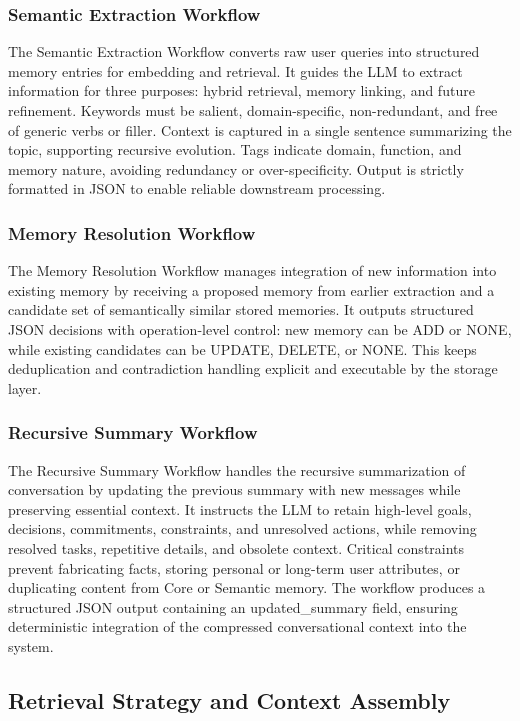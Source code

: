 \documentclass[12pt,a4paper]{article}
\begin{document}
\subsubsection{Semantic Extraction Workflow}

The Semantic Extraction Workflow converts raw user queries into structured memory entries for embedding and retrieval. It guides the LLM to extract information for three purposes: hybrid retrieval, memory linking, and future refinement. Keywords must be salient, domain-specific, non-redundant, and free of generic verbs or filler. Context is captured in a single sentence summarizing the topic, supporting recursive evolution. Tags indicate domain, function, and memory nature, avoiding redundancy or over-specificity. Output is strictly formatted in JSON to enable reliable downstream processing.

\subsubsection{Memory Resolution Workflow}

The Memory Resolution Workflow manages integration of new information into existing memory by receiving a proposed memory from earlier extraction and a candidate set of semantically similar stored memories. It outputs structured JSON decisions with operation-level control: new memory can be ADD or NONE, while existing candidates can be UPDATE, DELETE, or NONE. This keeps deduplication and contradiction handling explicit and executable by the storage layer.

\subsubsection{Recursive Summary Workflow}

The Recursive Summary Workflow handles the recursive summarization of conversation by updating the previous summary with new messages while preserving essential context. It instructs the LLM to retain high-level goals, decisions, commitments, constraints, and unresolved actions, while removing resolved tasks, repetitive details, and obsolete context. Critical constraints prevent fabricating facts, storing personal or long-term user attributes, or duplicating content from Core or Semantic memory. The workflow produces a structured JSON output containing an updated\_summary field, ensuring deterministic integration of the compressed conversational context into the system.

\subsection{Retrieval Strategy and Context Assembly}
\end{document}
